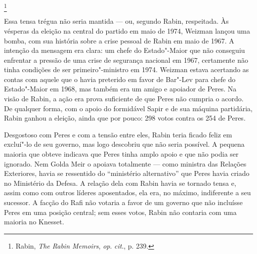 \footnote{Rabin, \textit{The Rabin Memoirs}, \textit{op}. \textit{cit}., p. 239.}

Essa tensa trégua não seria mantida --- ou, segundo Rabin, respeitada. Às
vésperas da eleição na central do partido em maio de 1974, Weizman
lançou uma bomba, com sua história sobre a crise pessoal de Rabin em maio
de 1967. A intenção da mensagem era clara: um chefe do Estado"-Maior que
não conseguiu enfrentar a pressão de uma crise de segurança nacional em
1967, certamente não tinha condições de ser primeiro"-ministro em 1974.
Weizman estava acertando as contas com aquele que o havia preterido em
favor de Bar"-Lev para chefe do Estado"-Maior em 1968, mas também era um
amigo e apoiador de Peres. Na visão de Rabin, a ação era prova
suficiente de que Peres não cumpria o acordo. De qualquer forma, com o
apoio do formidável Sapir e de sua máquina partidária, Rabin ganhou a
eleição, ainda que por pouco: 298 votos contra os 254 de Peres.

Desgostoso com Peres e com a tensão entre eles, Rabin teria ficado feliz em
excluí"-lo de seu governo, mas logo descobriu que não seria possível. A
pequena maioria que obteve indicava que Peres tinha amplo apoio e que não
podia ser ignorado. Nem Golda Meir o apoiava totalmente ---
como ministra das Relações Exteriores, havia se ressentido do ``ministério
alternativo'' que Peres havia criado no Ministério da Defesa. A relação
dela com Rabin havia se tornado tensa e, assim como com outros líderes
aposentados, ela era, no máximo, indiferente a seu sucessor. A facção do
Rafi não votaria a favor de um governo que não incluísse Peres em uma
posição central; sem esses votos, Rabin não contaria com uma
maioria no Knesset.

